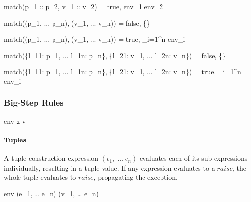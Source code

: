 \documentclass{article}
\begin{document}
    {match(p_1 :: p_2, v_1 :: v_2) = true, env_1 \cup env_2}

\smallskip

    {match((p_1, ... p_n), (v_1, ... v_n)) = false, \{\}}

    {match((p_1, ... p_n), (v_1, ... v_n)) = true, \displaystyle\bigcup_{i=1}^{n} env_i}

\smallskip

    {match(\{l_{11}: p_1, ... l_{1n}: p_n\}, \{l_{21}: v_1, ... l_{2n}: v_n\}) = false, \{\}}

    {match(\{l_{11}: p_1, ... l_{1n}: p_n\}, \{l_{21}: v_1, ... l_{2n}: v_n\}) = true,  \displaystyle \bigcup_{i=1}^{n} env_i}

\subsubsection{Big-Step Rules}




    {\mbox{env} \vdash x \Downarrow v}


\paragraph{Tuples}
A tuple construction expression $(e_1, \; \dots \; e_n)$ evaluates each of its sub-expressions individually, resulting in a tuple value.
If any expression evaluates to a $raise$, the whole tuple evaluates to $raise$, propagating the exception.

    {\mbox{env} \vdash (e_1, \; \dots \; e_n) \Downarrow (v_1, \; \dots \; e_n)}
\end{document}
